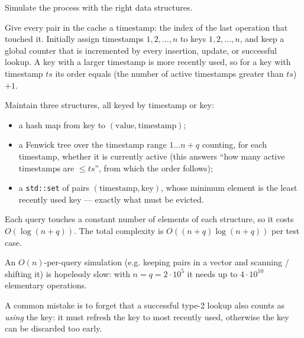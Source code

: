 Simulate the process with the right data structures.

Give every pair in the cache a timestamp: the index of the last operation that touched it. Initially assign timestamps $1, 2, \ldots, n$ to keys $1, 2, \ldots, n$, and keep a global counter that is incremented by every insertion, update, or successful lookup. A key with a larger timestamp is more recently used, so for a key with timestamp $ts$ its order equals (the number of active timestamps greater than $ts$) $+ 1$.

Maintain three structures, all keyed by timestamp or key:

\begin{itemize}
  \item a hash map from key to $(\text{value}, \text{timestamp})$;
  \item a Fenwick tree over the timestamp range $1 \ldots n+q$ counting, for each timestamp, whether it is currently active (this answers ``how many active timestamps are $\le ts$'', from which the order follows);
  \item a \texttt{std::set} of pairs $(\text{timestamp}, \text{key})$, whose minimum element is the least recently used key --- exactly what must be evicted.
\end{itemize}

Each query touches a constant number of elements of each structure, so it costs $O(\log(n+q))$. The total complexity is $O((n+q) \log (n+q))$ per test case.

An $O(n)$-per-query simulation (e.g. keeping pairs in a vector and scanning / shifting it) is hopelessly slow: with $n = q = 2 \cdot 10^5$ it needs up to $4 \cdot 10^{10}$ elementary operations.

A common mistake is to forget that a successful type-2 lookup also counts as \emph{using} the key: it must refresh the key to most recently used, otherwise the key can be discarded too early.
